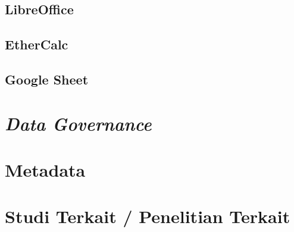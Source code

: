     \subsection{LibreOffice}


    \subsection{EtherCalc}


    \subsection{Google Sheet}


\section{\textit{Data Governance}}


\section{Metadata}


\section{Studi Terkait / Penelitian Terkait}
\blindtext
